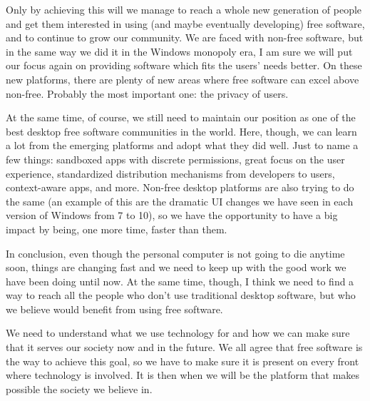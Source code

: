 Only by achieving this will we manage to reach a whole new generation of people and get them interested in using (and maybe eventually developing) free software, and to continue to grow our community. We are faced with non-free software, but in the same way we did it in the Windows monopoly era, I am sure we will put our focus again on providing software which fits the users’ needs better. On these new platforms, there are plenty of new areas where free software can excel above non-free. Probably the most important one: the privacy of users.

At the same time, of course, we still need to maintain our position as one of the best desktop free software communities in the world. Here, though, we can learn a lot from the emerging platforms and adopt what they did well. Just to name a few things: sandboxed apps with discrete permissions, great focus on the user experience, standardized distribution mechanisms from developers to users, context-aware apps, and more. Non-free desktop platforms are also trying to do the same (an example of this are the dramatic UI changes we have seen in each version of Windows from 7 to 10), so we have the opportunity to have a big impact by being, one more time, faster than them.

In conclusion, even though the personal computer is not going to die anytime soon, things are changing fast and we need to keep up with the good work we have been doing until now. At the same time, though, I think we need to find a way to reach all the people who don't use traditional desktop software, but who we believe would benefit from using free software.

We need to understand what we use technology for and how we can make sure that it serves our society now and in the future. We all agree that free software is the way to achieve this goal, so we have to make sure it is present on every front where technology is involved. It is then when we will be the platform that makes possible the society we believe in.
